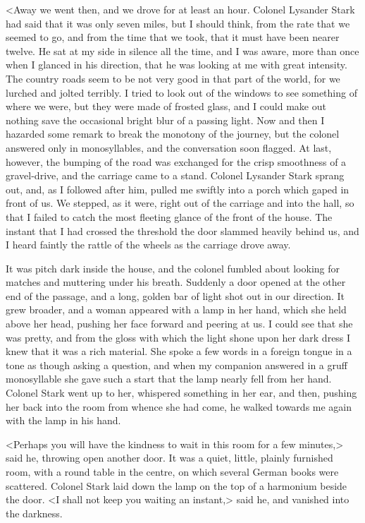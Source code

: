 <Away we went then, and we drove for at least an hour. Colonel Lysander Stark had said that it was only seven miles, but I should think, from the rate that we seemed to go, and from the time that we took, that it must have been nearer twelve. He sat at my side in silence all the time, and I was aware, more than once when I glanced in his direction, that he was looking at me with great intensity. The country roads seem to be not very good in that part of the world, for we lurched and jolted terribly. I tried to look out of the windows to see something of where we were, but they were made of frosted glass, and I could make out nothing save the occasional bright blur of a passing light. Now and then I hazarded some remark to break the monotony of the journey, but the colonel answered only in monosyllables, and the conversation soon flagged. At last, however, the bumping of the road was exchanged for the crisp smoothness of a gravel-drive, and the carriage came to a stand. Colonel Lysander Stark sprang out, and, as I followed after him, pulled me swiftly into a porch which gaped in front of us. We stepped, as it were, right out of the carriage and into the hall, so that I failed to catch the most fleeting glance of the front of the house. The instant that I had crossed the threshold the door slammed heavily behind us, and I heard faintly the rattle of the wheels as the carriage drove away.

It was pitch dark inside the house, and the colonel fumbled about looking for matches and muttering under his breath. Suddenly a door opened at the other end of the passage, and a long, golden bar of light shot out in our direction. It grew broader, and a woman appeared with a lamp in her hand, which she held above her head, pushing her face forward and peering at us. I could see that she was pretty, and from the gloss with which the light shone upon her dark dress I knew that it was a rich material. She spoke a few words in a foreign tongue in a tone as though asking a question, and when my companion answered in a gruff monosyllable she gave such a start that the lamp nearly fell from her hand. Colonel Stark went up to her, whispered something in her ear, and then, pushing her back into the room from whence she had come, he walked towards me again with the lamp in his hand.

<Perhaps you will have the kindness to wait in this room for a few minutes,> said he, throwing open another door. It was a quiet, little, plainly furnished room, with a round table in the centre, on which several German books were scattered. Colonel Stark laid down the lamp on the top of a harmonium beside the door. <I shall not keep you waiting an instant,> said he, and vanished into the darkness.

